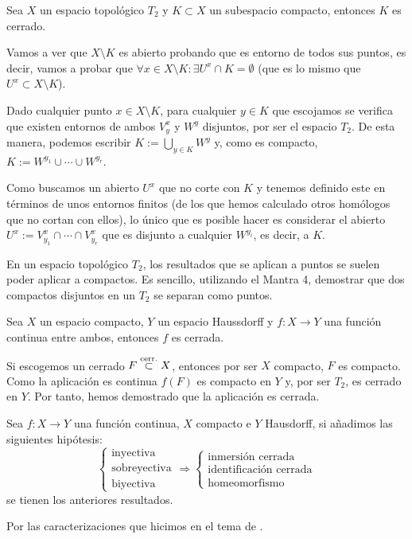 \begin{prop}[Mantra 4]
Sea $X$ un espacio topológico $T_2$ y $K\subset X$ un subespacio compacto, entonces $K$ es cerrado.
\end{prop}
\begin{demo}
Vamos a ver que $X \setminus K$ es abierto probando que es entorno de todos sus puntos, es decir, vamos a probar que $\forall x\in X\setminus K : \exists U^x \cap K = \emptyset$ (que es lo mismo que $U^x \subset X\setminus K$). 

Dado cualquier punto $x\in X\setminus K$, para cualquier $y\in K$ que escojamos se verifica que existen entornos de ambos $V^x_y$ y $W^y$ disjuntos, por ser el espacio $T_2$. De esta manera, podemos escribir $K := \bigcup_{y\in K} W^y$ y, como es compacto, $K := W^{y_1} \cup \cdots \cup W^{y_r}$.

Como buscamos un abierto $U^x$ que no corte con $K$ y tenemos definido este en términos de unos entornos finitos (de los que hemos calculado otros homólogos que no cortan con ellos), lo único que es posible hacer es considerar el abierto $U^x := V^x_{y_1} \cap \cdots \cap V^{x}_{y_r}$ que es disjunto a cualquier $W^{y_i}$, es decir, a $K$.
\end{demo}

\begin{obs}
En un espacio topológico $T_2$, los resultados que se aplican a puntos se suelen poder aplicar a compactos. Es sencillo, utilizando el Mantra 4, demostrar que dos compactos disjuntos en un $T_2$ se separan como puntos.
\end{obs}

\begin{prop}
Sea $X$ un espacio compacto, $Y$ un espacio Haussdorff y $f : X \rightarrow Y$ una función continua entre ambos, entonces $f$ es cerrada.
\end{prop}
\begin{demo}
Si escogemos un cerrado $F \stackrel{\text{cerr.}}{\subset} X$, entonces por ser $X$ compacto, $F$ es compacto. Como la aplicación es continua $f(F)$ es compacto en $Y$ y, por ser $T_2$, es cerrado en $Y$. Por tanto, hemos demostrado que la aplicación es cerrada.
\end{demo}

\begin{coro}
Sea $f : X \rightarrow Y$ una función continua, $X$ compacto e $Y$ Hausdorff, si añadimos las siguientes hipótesis:
\[
\begin{cases}
    \text{inyectiva}\\
    \text{sobreyectiva}\\
    \text{biyectiva}
\end{cases} \Rightarrow
\begin{cases}
    \text{inmersión cerrada}\\
    \text{identificación cerrada}\\
    \text{homeomorfismo}
\end{cases} 
\]
se tienen los anteriores resultados.
\end{coro}
\begin{demo}
Por las caracterizaciones que hicimos en el tema de .
\end{demo}

